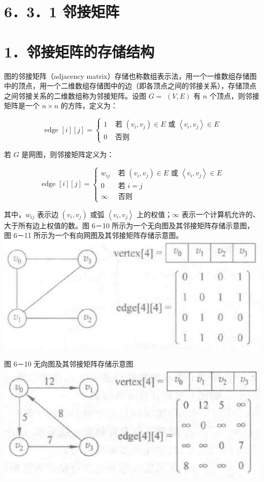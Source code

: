 \documentclass[10pt]{article}
\begin{document}
\section*{6．3．1 邻接矩阵}
\section*{1．邻接矩阵的存储结构}
图的邻接矩阵（adjacency matrix）存储也称数组表示法，用一个一维数组存储图中的顶点，用一个二维数组存储图中的边（即各顶点之间的邻接关系），存储顶点之间邻接关系的二维数组称为邻接矩阵。设图 $G=$ $(V, E)$ 有 $n$ 个顶点，则邻接矩阵是一个 $n \times n$ 的方阵，定义为：

\[
\text { edge }[i][j]= \begin{cases}1 & \text { 若 }\left(v_{i}, v_{j}\right) \in E \text { 或 }\left\langle v_{i}, v_{j}\right\rangle \in E  \tag{6-3}\\ 0 & \text { 否则 }\end{cases}
\]

若 $G$ 是网图，则邻接矩阵定义为：

\[
\text { edge }[i][j]=\left\{\begin{array}{cl}
w_{i j} & \text { 若 }\left(v_{i}, v_{j}\right) \in E \text { 或 }\left\langle v_{i}, v_{j}\right\rangle \in E  \tag{6-4}\\
0 & \text { 若 } i=j \\
\infty & \text { 否则 }
\end{array}\right.
\]

其中，$w_{i j}$ 表示边 $\left(v_{i}, v_{j}\right)$ 或弧 $\left\langle v_{i}, v_{j}\right\rangle$ 上的权值；$\infty$ 表示一个计算机允许的、大于所有边上权值的数。图 6－10 所示为一个无向图及其邻接矩阵存储示意图，图 6－11 所示为一个有向网图及其邻接矩阵存储示意图。\\
\includegraphics[max width=\textwidth, center]{2025_06_06_704745ea57b15b2333e5g-192}

图 6－10 无向图及其邻接矩阵存储示意图\\
\includegraphics[max width=\textwidth, center]{2025_06_06_704745ea57b15b2333e5g-192(1)}
\end{document}
